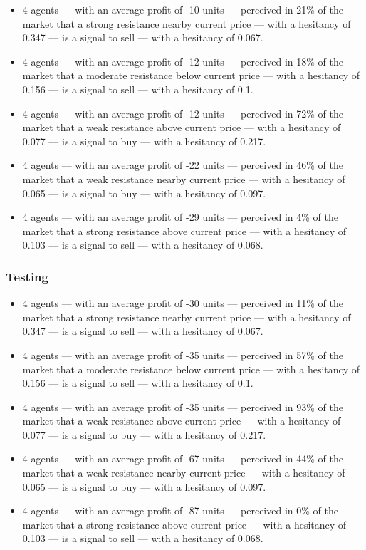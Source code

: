 {\small
  \begin{itemize}
  \item 4 agents — with an average profit of -10 units — perceived in 21\% of
    the market that a strong resistance nearby current price — with a hesitancy
    of 0.347 — is a signal to sell — with a hesitancy of 0.067.
  \item 4 agents — with an average profit of -12 units — perceived in 18\% of
    the market that a moderate resistance below current price — with a hesitancy
    of 0.156 — is a signal to sell — with a hesitancy of 0.1.
  \item 4 agents — with an average profit of -12 units — perceived in 72\% of
    the market that a weak resistance above current price — with a hesitancy of
    0.077 — is a signal to buy — with a hesitancy of 0.217.
  \item 4 agents — with an average profit of -22 units — perceived in 46\% of
    the market that a weak resistance nearby current price — with a hesitancy of
    0.065 — is a signal to buy — with a hesitancy of 0.097.
  \item 4 agents — with an average profit of -29 units — perceived in 4\% of the
    market that a strong resistance above current price — with a hesitancy of
    0.103 — is a signal to sell — with a hesitancy of 0.068.
  \end{itemize}
}

\subsubsection{Testing}
\label{}

{\small
  \begin{itemize}
  \item 4 agents — with an average profit of -30 units — perceived in 11\% of
    the market that a strong resistance nearby current price — with a hesitancy
    of 0.347 — is a signal to sell — with a hesitancy of 0.067.
  \item 4 agents — with an average profit of -35 units — perceived in 57\% of
    the market that a moderate resistance below current price — with a hesitancy
    of 0.156 — is a signal to sell — with a hesitancy of 0.1.
  \item 4 agents — with an average profit of -35 units — perceived in 93\% of
    the market that a weak resistance above current price — with a hesitancy of
    0.077 — is a signal to buy — with a hesitancy of 0.217.
  \item 4 agents — with an average profit of -67 units — perceived in 44\% of
    the market that a weak resistance nearby current price — with a hesitancy of
    0.065 — is a signal to buy — with a hesitancy of 0.097.
  \item 4 agents — with an average profit of -87 units — perceived in 0\% of the
    market that a strong resistance above current price — with a hesitancy of
    0.103 — is a signal to sell — with a hesitancy of 0.068.
  \end{itemize}
}





